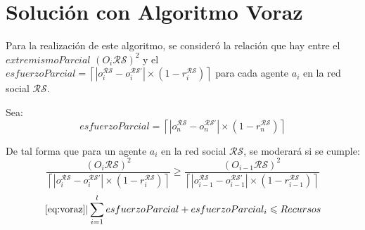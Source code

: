 \documentclass[letterpaper,10pt]{article}
\begin{document}
\section{Solución con Algoritmo Voraz}
\label{sec:algoritmo_voraz}
Para la realización de este algoritmo, se consideró la relación que hay entre el $extremismoParcial$ $(O_i\mathcal{R} \mathcal{S})^2$ y el $esfuerzoParcial = \left\lceil  |o_i^{\mathcal{R}\mathcal{S}} - o_i^{\mathcal{R}\mathcal{S}'}| \times (1 - r_i^{\mathcal{R}\mathcal{S}}) \right\rceil$ para cada agente $a_i$ en la red social $\mathcal{R}\mathcal{S}$.

Sea:
\[
  esfuerzoParcial = \left\lceil  |o_n^{\mathcal{R}\mathcal{S}} - o_n^{\mathcal{R}\mathcal{S}'}| \times (1 - r_n^{\mathcal{R}\mathcal{S}}) \right\rceil
\]

De tal forma que para un agente $a_i$ en la red social $\mathcal{R}\mathcal{S}$, se moderará si se cumple:
\begin{equation}
  \frac{(O_i\mathcal{R} \mathcal{S})^2}{\left\lceil  |o_i^{\mathcal{R}\mathcal{S}} - o_i^{\mathcal{R}\mathcal{S}'}| \times (1 - r_i^{\mathcal{R}\mathcal{S}}) \right\rceil} \geqslant  \frac{(O_{i-1} \mathcal{R} \mathcal{S})^2}{\left\lceil  |o_{i-1}^{\mathcal{R}\mathcal{S}} - o_{i-1}^{\mathcal{R}\mathcal{S}'}| \times (1 - r_{i-1}^{\mathcal{R}\mathcal{S}}) \right\rceil}
  \label{eq:voraz}
\end{equation}
\begin{equation}
  \eqref{eq:voraz} | \sum_{i=1}^{l}esfuerzoParcial + esfuerzoParcial_i \leqslant Recursos
  \label{eq:voraz2}
\end{equation}
\end{document}
